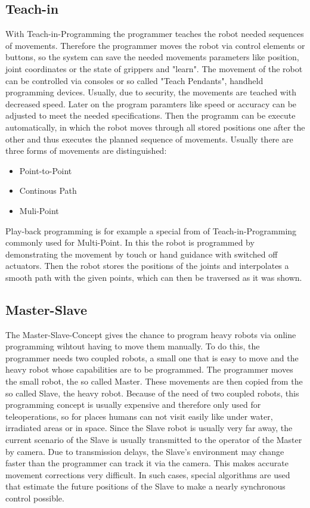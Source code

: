 \documentclass[conference]{IEEEtran}
\begin{document}
    \subsection{Teach-in}
        With Teach-in-Programming the programmer teaches the robot needed sequences of movements. Therefore the programmer moves the robot via control elements or buttons, so the system can save the needed movements parameters like position, joint coordinates or the state of grippers and "learn". The movement of the robot can be controlled via consoles or so called "Teach Pendants", handheld programming devices. %
        Usually, due to security, the movements are teached with decreased speed. Later on the program paramters like speed or accuracy can be adjusted to meet the needed specifications. Then the programm can be execute automatically, in which the robot moves through all stored positions one after the other and thus executes the planned sequence of movements. %
        Usually there are three forms of movements are distinguished:
        \begin{itemize}
            \item Point-to-Point
            \item Continous Path
            \item Muli-Point
        \end{itemize}

        Play-back programming is for example a special from of Teach-in-Programming commonly used for Multi-Point. In this the robot is programmed by demonstrating the movement by touch or hand guidance with switched off actuators. Then the robot stores the positions of the joints and interpolates a smooth path with the given points, which can then be traversed as it was shown. %

    \subsection{Master-Slave}
        The Master-Slave-Concept gives the chance to program heavy robots via online programming wihtout having to move them manually. To do this, the programmer needs two coupled robots, a small one that is easy to move and the heavy robot whose capabilities are to be programmed. The programmer moves the small robot, the so called Master. These movements are then copied from the so called Slave, the heavy robot. Because of the need of two coupled robots, this programming concept is usually expensive and therefore only used for teleoperations, so for places humans can not visit easily like under water, irradiated areas or in space. Since the Slave robot is usually very far away, the current scenario of the Slave is usually transmitted to the operator of the Master by camera. Due to transmission delays, the Slave's environment may change faster than the programmer can track it via the camera. This makes accurate movement corrections very difficult. In such cases, special algorithms are used that estimate the future positions of the Slave to make a nearly synchronous control possible. %
\end{document}
